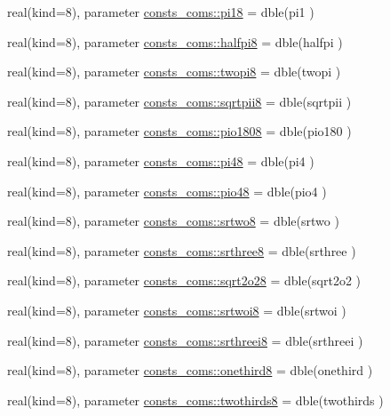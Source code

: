 \begin{DoxyCompactItemize}
\item 
real(kind=8), parameter \hyperlink{namespaceconsts__coms_a5bd1925089f1e1e701a194a3cd46e231}{consts\+\_\+coms\+::pi18} = dble(pi1 )
\item 
real(kind=8), parameter \hyperlink{namespaceconsts__coms_acf446d5c999d6f8574b77c92e6865da5}{consts\+\_\+coms\+::halfpi8} = dble(halfpi )
\item 
real(kind=8), parameter \hyperlink{namespaceconsts__coms_ab728c4b63f956137bc8a94c8ba42c675}{consts\+\_\+coms\+::twopi8} = dble(twopi )
\item 
real(kind=8), parameter \hyperlink{namespaceconsts__coms_ac4df29a8f6a46e9631d4db71c20e8f7d}{consts\+\_\+coms\+::sqrtpii8} = dble(sqrtpii )
\item 
real(kind=8), parameter \hyperlink{namespaceconsts__coms_a6ae896a14b40bb0f430a950730e58d8a}{consts\+\_\+coms\+::pio1808} = dble(pio180 )
\item 
real(kind=8), parameter \hyperlink{namespaceconsts__coms_affa58f83c899d90c43e413c5ef490e2c}{consts\+\_\+coms\+::pi48} = dble(pi4 )
\item 
real(kind=8), parameter \hyperlink{namespaceconsts__coms_abab446622b05b70fe152b8ce68c3d2ab}{consts\+\_\+coms\+::pio48} = dble(pio4 )
\item 
real(kind=8), parameter \hyperlink{namespaceconsts__coms_a3cc8958e1839e97fd0518a4597b913a8}{consts\+\_\+coms\+::srtwo8} = dble(srtwo )
\item 
real(kind=8), parameter \hyperlink{namespaceconsts__coms_a8dbf0a0b3abb2d077c183c16821735b9}{consts\+\_\+coms\+::srthree8} = dble(srthree )
\item 
real(kind=8), parameter \hyperlink{namespaceconsts__coms_a48b8676172e0d996bb646f8bd0d01e26}{consts\+\_\+coms\+::sqrt2o28} = dble(sqrt2o2 )
\item 
real(kind=8), parameter \hyperlink{namespaceconsts__coms_a3360764f696a099efdec0e23febe82d8}{consts\+\_\+coms\+::srtwoi8} = dble(srtwoi )
\item 
real(kind=8), parameter \hyperlink{namespaceconsts__coms_a0b5dc83302d90a8e7fe30ffed222c517}{consts\+\_\+coms\+::srthreei8} = dble(srthreei )
\item 
real(kind=8), parameter \hyperlink{namespaceconsts__coms_a56785c4a5099759491b652bdcd9439f0}{consts\+\_\+coms\+::onethird8} = dble(onethird )
\item 
real(kind=8), parameter \hyperlink{namespaceconsts__coms_a9e055a545c5ace049296c3a15aa12b83}{consts\+\_\+coms\+::twothirds8} = dble(twothirds )
\item 

\end{DoxyCompactItemize}
